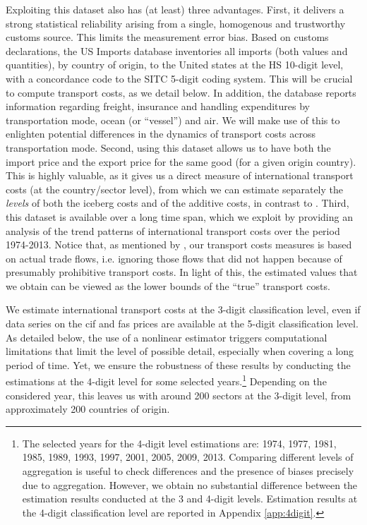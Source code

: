 \documentclass[a4paper,11pt]{article}
\begin{document}
Exploiting this dataset also has (at least) three advantages. First, it delivers a strong statistical reliability arising from a single, homogenous and trustworthy customs source.  This limits the measurement error bias. Based on customs declarations, the US Imports database inventories all imports (both values and quantities), by country of origin, to the United states at the HS 10-digit level, with a concordance code to the SITC 5-digit coding system. This will be crucial to compute transport costs, as we detail below. In addition, the database reports information regarding freight, insurance and handling expenditures by transportation mode, ocean (or ``vessel'') and air. We will make use of this to enlighten potential differences in the dynamics of transport costs across transportation mode. Second, using this dataset allows us to have both the import price and the export price for the same good (for a given origin country). This is highly valuable, as it gives us a direct measure of international transport costs (at the country/sector level), from which we can estimate separately the \textit{levels} of both the iceberg costs and of the additive costs, in contrast to \cite{Irrazabal_2015}. Third, this dataset is available over a long time span, which we exploit by providing an analysis of the trend patterns of international transport costs over the period 1974-2013. Notice that, as mentioned by \cite{Lafourcade_Thisse}, our transport costs measures is based on actual trade flows, i.e. ignoring those flows that did not happen because of presumably prohibitive transport costs. In light of this, the estimated values that we obtain can be viewed as the lower bounds of the ``true'' transport costs.\smallskip


We estimate international transport costs at the 3-digit classification level, even if data series on the cif and fas prices are available at the 5-digit classification level. As detailed below, the use of a nonlinear estimator triggers computational limitations that limit the level of possible detail, especially when covering a long period of time. Yet, we ensure the robustness of these results by conducting the estimations at the 4-digit level for some selected years.\footnote{The selected years for the 4-digit level estimations are: 1974, 1977, 1981, 1985, 1989, 1993, 1997, 2001, 2005, 2009, 2013. Comparing different levels of aggregation is useful to check differences and the presence of biases precisely due to aggregation. However, we obtain no substantial difference between the estimation results conducted at the 3 and 4-digit levels. Estimation results at the 4-digit classification level are reported in Appendix \ref{app:4digit}.} Depending on the considered year, this leaves us with around 200 sectors at the 3-digit level, from approximately 200 countries of origin.
\end{document}
